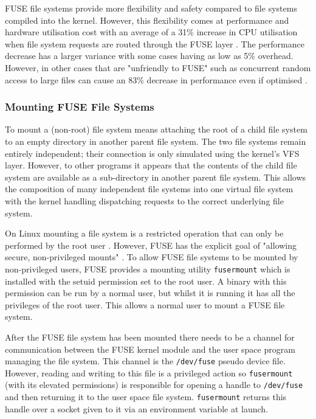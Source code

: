 FUSE file systems provide more flexibility and safety compared to file systems
compiled into the kernel. However, this flexibility comes at performance and
hardware utilisation cost with an average of a 31\% increase in CPU utilisation
when file system requests are routed through the FUSE layer \cite{fuse-perf}.
The performance decrease has a larger variance with some cases having as low as
5\% overhead. However, in other cases that are "unfriendly to FUSE" such as
concurrent random access to large files can cause an 83\% decrease in
performance even if optimised \cite{fuse-perf}.

\subsubsection{Mounting FUSE File Systems}
\label{mounting-fuse-fs}

To mount a (non-root) file system means attaching the root of a child file
system to an empty directory in another parent file system. The two file
systems remain entirely independent; their connection is only simulated using
the kernel's VFS layer. However, to other programs it appears that the contents
of the child file system are available as a sub-directory in another parent
file system. This allows the composition of many independent file systems into
one virtual file system with the kernel handling dispatching requests to the
correct underlying file system.

On Linux mounting a file system is a restricted operation that can only be
performed by the root user \cite{mount}. However, FUSE has the explicit goal of
"allowing secure, non-privileged mounts" \cite{kernel-fuse}. To allow FUSE file
systems to be mounted by non-privileged users, FUSE provides a mounting utility
\texttt{fusermount} which is installed with the setuid \cite{setuid} permission
set to the root user. A binary with this permission can be run by a normal
user, but whilst it is running it has all the privileges of the root user. This
allows a normal user to mount a FUSE file system.

After the FUSE file system has been mounted there needs to be a channel for
communication between the FUSE kernel module and the user space program
managing the file system. This channel is the \texttt{/dev/fuse} pseudo device
file. However, reading and writing to this file is a privileged action so
\texttt{fusermount} (with its elevated permissions) is responsible for opening
a handle to \texttt{/dev/fuse} and then returning it to the user space file
system. \texttt{fusermount} returns this handle over a socket given to it via
an environment variable at launch.

